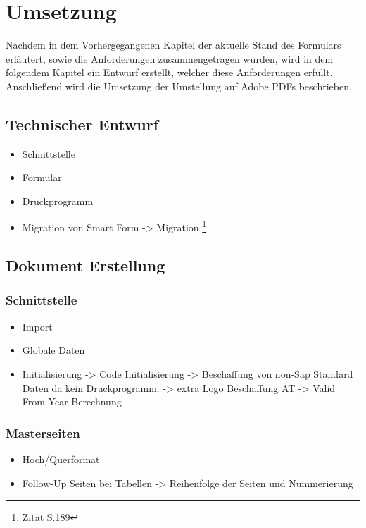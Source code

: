 \chapter{Umsetzung}

 Nachdem in dem Vorhergegangenen Kapitel der aktuelle Stand des Formulars erläutert, sowie die Anforderungen zusammengetragen wurden, wird in dem folgendem Kapitel ein Entwurf erstellt, welcher diese Anforderungen erfüllt. Anschließend wird die Umsetzung der Umstellung auf Adobe PDFs beschrieben.

 \section{Technischer Entwurf}
 

 
 \begin{itemize}
 	\item Schnittstelle
 	\item Formular
 	\item Druckprogramm
 	\item Migration von Smart Form -> Migration \footnote{Zitat \cite{Schmiechen.2016} S.189}
 \end{itemize}

\section{Dokument Erstellung}
\subsection{Schnittstelle}
	\begin{itemize}
		\item Import
		\item Globale Daten
		\item Initialisierung -> Code Initialisierung -> Beschaffung von non-Sap Standard Daten da kein Druckprogramm. -> extra Logo Beschaffung AT -> Valid From Year Berechnung
	\end{itemize}
\subsection{Masterseiten}
  \begin{itemize}
  	\item Hoch/Querformat
  	\item Follow-Up Seiten bei Tabellen -> Reihenfolge der Seiten und Nummerierung 
  \end{itemize}

